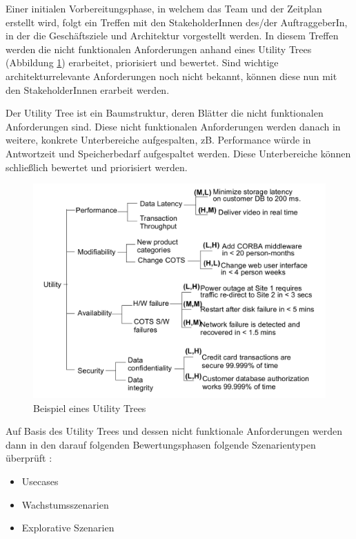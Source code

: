 Einer initialen Vorbereitungsphase, in welchem das Team und der Zeitplan erstellt wird, folgt ein Treffen mit den StakeholderInnen des/der AuftraggeberIn, in der die Geschäftsziele und Architektur vorgestellt werden. In diesem Treffen werden die nicht funktionalen Anforderungen anhand eines Utility Trees (Abbildung \ref{fig:utility}) erarbeitet, priorisiert und bewertet. Sind wichtige architekturrelevante Anforderungen noch nicht bekannt, können diese nun mit den StakeholderInnen erarbeit werden. \cite[S. 184-199]{basiswissen}

Der Utility Tree ist ein Baumstruktur, deren Blätter die nicht funktionalen Anforderungen sind. Diese nicht funktionalen Anforderungen werden danach in weitere, konkrete Unterbereiche aufgespalten, zB. Performance würde in Antwortzeit und Speicherbedarf aufgespaltet werden. Diese Unterbereiche können schließlich bewertet und priorisiert werden.

\begin{figure}[H]
    \centering
    \includegraphics[scale=0.4]{img/utilitytree.png}
    \caption{Beispiel eines Utility Trees \cite[S. 17]{ATAM}}
    \label{fig:utility}
\end{figure}

Auf Basis des Utility Trees und dessen nicht funktionale Anforderungen werden dann in den darauf folgenden Bewertungsphasen folgende Szenarientypen überprüft \cite[S. 62-67]{review}\cite[S. 188]{basiswissen}:

\begin{itemize}
  \item Usecases
  \item Wachstumsszenarien
  \item Explorative Szenarien
\end{itemize}

